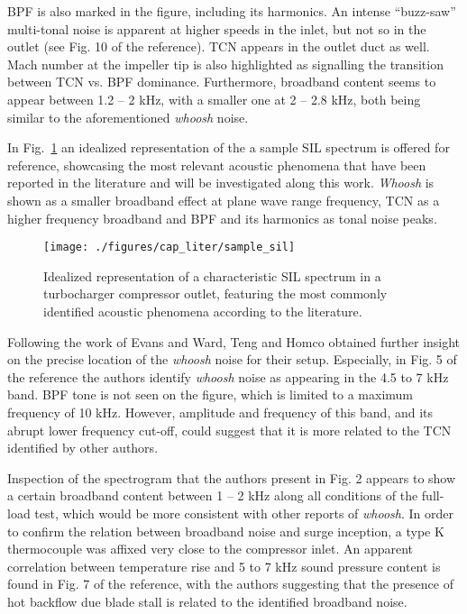 BPF is also marked in the figure, including its harmonics. An intense ``buzz-saw'' multi-tonal noise is apparent at higher speeds in the inlet, but not so in the outlet (see Fig. 10 of the reference). TCN appears in the outlet duct as well. Mach number at the impeller tip is also highlighted as signalling the transition between TCN vs. BPF dominance. Furthermore, broadband content seems to appear between 1.2 -- 2 kHz, with a smaller one at 2 -- 2.8 kHz, both being similar to the aforementioned \emph{whoosh} noise.

In Fig.~\ref{fig:sample_sil} an idealized representation of the a sample SIL spectrum is offered for reference, showcasing the most relevant acoustic phenomena that have been reported in the literature and will be investigated along this work. \emph{Whoosh} is shown as a smaller broadband effect at plane wave range frequency, TCN as a higher frequency broadband and BPF and its harmonics as tonal noise peaks.

\begin{figure}[ht!]
\centering
\texttt{[image: ./figures/cap\_liter/sample\_sil]}
\caption[Idealized representation of a characteristic SIL spectrum]{Idealized representation of a characteristic SIL spectrum in a turbocharger compressor outlet, featuring the most commonly identified acoustic phenomena according to the literature.}
\label{fig:sample_sil}
\end{figure}

Following the work of Evans and Ward, Teng and Homco \cite{teng2009investigation} obtained further insight on the precise location of the \emph{whoosh} noise for their setup. Especially, in Fig. 5 of the reference the authors identify \emph{whoosh} noise as appearing in the 4.5 to 7 kHz band. BPF tone is not seen on the figure, which is limited to a maximum frequency of 10 kHz. However, amplitude and frequency of this band, and its abrupt lower frequency cut-off, could suggest that it is more related to the TCN identified by other authors. 

Inspection of the spectrogram that the authors present in Fig. 2 appears to show a certain broadband content between 1 -- 2 kHz along all conditions of the full-load test, which would be more consistent with other reports of \emph{whoosh}. In order to confirm the relation between broadband noise and surge inception, a type K thermocouple was affixed very close to the compressor inlet. An apparent correlation between temperature rise and 5 to 7 kHz sound pressure content is found in Fig. 7 of the reference, with the authors suggesting that the presence of hot backflow due blade stall is related to the identified broadband noise.

